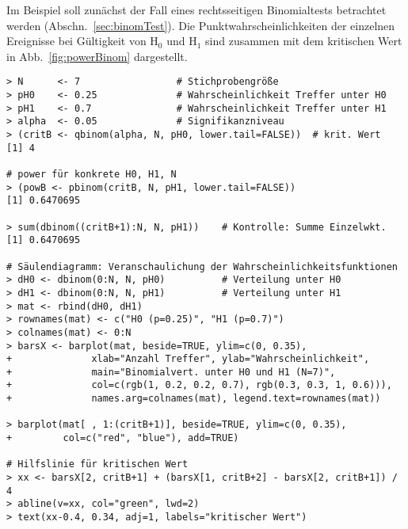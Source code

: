 Im Beispiel soll zunächst der Fall eines rechtsseitigen Binomialtests betrachtet werden (Abschn.\ \ref{sec:binomTest}). Die Punktwahrscheinlichkeiten der einzelnen Ereignisse bei Gültigkeit von $\text{H}_{0}$ und $\text{H}_{1}$ sind zusammen mit dem kritischen Wert in Abb.\ \ref{fig:powerBinom} dargestellt.
\begin{lstlisting}
> N      <- 7                 # Stichprobengröße
> pH0    <- 0.25              # Wahrscheinlichkeit Treffer unter H0
> pH1    <- 0.7               # Wahrscheinlichkeit Treffer unter H1
> alpha  <- 0.05              # Signifikanzniveau
> (critB <- qbinom(alpha, N, pH0, lower.tail=FALSE))  # krit. Wert
[1] 4

# power für konkrete H0, H1, N
> (powB <- pbinom(critB, N, pH1, lower.tail=FALSE))
[1] 0.6470695

> sum(dbinom((critB+1):N, N, pH1))    # Kontrolle: Summe Einzelwkt.
[1] 0.6470695

# Säulendiagramm: Veranschaulichung der Wahrscheinlichkeitsfunktionen
> dH0 <- dbinom(0:N, N, pH0)          # Verteilung unter H0
> dH1 <- dbinom(0:N, N, pH1)          # Verteilung unter H1
> mat <- rbind(dH0, dH1)
> rownames(mat) <- c("H0 (p=0.25)", "H1 (p=0.7)")
> colnames(mat) <- 0:N
> barsX <- barplot(mat, beside=TRUE, ylim=c(0, 0.35),
+              xlab="Anzahl Treffer", ylab="Wahrscheinlichkeit",
+              main="Binomialvert. unter H0 und H1 (N=7)",
+              col=c(rgb(1, 0.2, 0.2, 0.7), rgb(0.3, 0.3, 1, 0.6))),
+              names.arg=colnames(mat), legend.text=rownames(mat))

> barplot(mat[ , 1:(critB+1)], beside=TRUE, ylim=c(0, 0.35),
+         col=c("red", "blue"), add=TRUE)

# Hilfslinie für kritischen Wert
> xx <- barsX[2, critB+1] + (barsX[1, critB+2] - barsX[2, critB+1]) / 4
> abline(v=xx, col="green", lwd=2)
> text(xx-0.4, 0.34, adj=1, labels="kritischer Wert")
\end{lstlisting}

